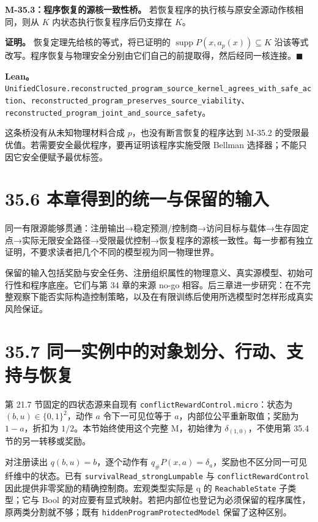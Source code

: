 \documentclass[
  11pt,
  oneside]{book}
\begin{document}
\hypertarget{m-35-3}{}\label{m-35-3}

\textbf{M-35.3：程序恢复的源核一致性桥。} 若恢复程序的执行核与原安全源动作核相同，则从 \(K\) 内状态执行恢复程序后仍支撑在 \(K\)。

\textbf{证明。} 恢复定理先给核的等式，将已证明的 \(\operatorname{supp}P(x,a_p(x))\subseteq K\) 沿该等式改写。程序恢复与物理安全分别由它们自己的前提取得，然后经同一核连接。\(\blacksquare\)

\textbf{Lean。} \nolinkurl{UnifiedClosure.reconstructed_program_source_kernel_agrees_with_safe_action}、\nolinkurl{reconstructed_program_preserves_source_viability}、\nolinkurl{reconstructed_program_joint_and_source_safety}。

这条桥没有从未知物理材料合成 \(p\)，也没有断言恢复的程序达到 M-35.2 的受限最优值。若需要安全最优程序，要再证明该程序实施受限 Bellman 选择器；不能只因它安全便赋予最优标签。

\section{35.6 本章得到的统一与保留的输入}\label{ux672cux7ae0ux5f97ux5230ux7684ux7edfux4e00ux4e0eux4fddux7559ux7684ux8f93ux5165}

同一有限源能够贯通：注册输出→稳定预测/控制商→访问目标与载体→生存固定点→实际无限安全路径→受限最优控制→恢复程序的源核一致性。每一步都有独立证明，不要求读者把几个不同的模型视为同一物理世界。

保留的输入包括奖励与安全任务、注册组织属性的物理意义、真实源模型、初始可行性和程序底座。它们与第 34 章的来源 no-go 相容。后三章进一步研究：在不完整观察下能否实际构造控制策略，以及在有限训练后使用所选模型时怎样形成真实风险保证。

\section{35.7 同一实例中的对象划分、行动、支持与恢复}\label{ux540cux4e00ux5b9eux4f8bux4e2dux7684ux5bf9ux8c61ux5212ux5206ux884cux52a8ux652fux6301ux4e0eux6062ux590d}

第 21.7 节固定的四状态源来自现有 \nolinkurl{conflictRewardControl.micro}：状态为 \((b,u)\in\{0,1\}^2\)，动作 \(a\) 令下一可见位等于 \(a\)，内部位公平重新取值；奖励为 \(1-a\)，折扣为 \(1/2\)。本节始终使用这个完整 M，初始律为 \(\delta_{(1,0)}\)，不使用第 35.4 节的另一转移或奖励。

对注册读出 \(q(b,u)=b\)，逐个动作有 \(q_\#P(x,a)=\delta_a\)，奖励也不区分同一可见纤维中的状态。已有 \nolinkurl{survivalRead_strongLumpable} 与 \nolinkurl{conflictRewardControl} 因此提供非零奖励的精确控制商。宏观类型实际是 q 的 \nolinkurl{ReachableState} 子类型；它与 Bool 的对应要有显式映射。若把内部位也登记为必须保留的程序属性，原两类分割就不够；既有 \nolinkurl{hiddenProgramProtectedModel} 保留了这种区别。
\end{document}

